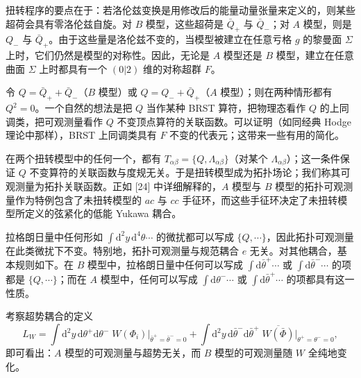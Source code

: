 扭转程序的要点在于：若洛伦兹变换是用修改后的能量动量张量来定义的，则某些超荷会具有零洛伦兹自旋。对 $B$ 模型，这些超荷是 $\bar Q_{+}$ 与 $\bar Q_{-}$；对 $A$ 模型，则是 $Q_{-}$ 与 $\bar Q_{+}$。由于这些量是洛伦兹不变的，当模型被建立在任意亏格 $g$ 的黎曼面 $\Sigma$ 上时，它们仍然是模型的对称性。因此，无论是 $A$ 模型还是 $B$ 模型，建立在任意曲面 $\Sigma$ 上时都具有一个 $(0|2)$ 维的对称超群 $F$。

令 $Q=\bar Q_{+}+\bar Q_{-}$（$B$ 模型）或 $Q=Q_{-}+\bar Q_{+}$（$A$ 模型）；则在两种情形都有 $Q^{2}=0$。一个自然的想法是把 $Q$ 当作某种 BRST 算符，把物理态看作 $Q$ 的上同调类，把可观测量看作 $Q$ 不变顶点算符的关联函数。可以证明（如同经典 Hodge 理论中那样），BRST 上同调类具有 $F$ 不变的代表元；这带来一些有用的简化。


\label{op:34}
在两个扭转模型中的任何一个，都有 $T_{\alpha\beta}=\{Q,\Lambda_{\alpha\beta}\}$（对某个 $\Lambda_{\alpha\beta}$）；这一条件保证 $Q$ 不变算符的关联函数与度规无关。于是扭转模型成为拓扑场论；我们称其可观测量为拓扑关联函数。正如 [24] 中详细解释的，$A$ 模型与 $B$ 模型的拓扑可观测量作为特例包含了未扭转模型的 $ac$ 与 $cc$ 手征环，而这些手征环决定了未扭转模型所定义的弦紧化的低能 Yukawa 耦合。

拉格朗日量中任何形如 $\int \mathrm{d}^{2}y\,\mathrm{d}^{4}\theta\cdots$ 的微扰都可以写成 $\{Q,\cdots\}$，因此拓扑可观测量在此类微扰下不变。特别地，拓扑可观测量与规范耦合 $e$ 无关。对其他耦合，基本规则如下。在 $B$ 模型中，拉格朗日量中任何可以写成 $\int \mathrm{d}\bar\theta^{+}\cdots$ 或 $\int \mathrm{d}\bar\theta^{-}\cdots$ 的项都是 $\{Q,\cdots\}$；而在 $A$ 模型中，任何可以写成 $\int \mathrm{d}\theta^{-}\cdots$ 或 $\int \mathrm{d}\bar\theta^{+}\cdots$ 的项都具有这一性质。

考察超势耦合的定义
\begin{equation}
\tag{3.31}
L_{W}=\int \mathrm{d}^{2}y\,\mathrm{d}\theta^{+}\mathrm{d}\theta^{-}\;W(\Phi_{i})\big|_{\bar\theta^{+}=\bar\theta^{-}=0}+\int \mathrm{d}^{2}y\,\mathrm{d}\bar\theta^{-}\mathrm{d}\bar\theta^{+}\;\overline{W(\bar\Phi)}\big|_{\theta^{+}=\theta^{-}=0},
\end{equation}
即可看出：$A$ 模型的可观测量与超势无关，而 $B$ 模型的可观测量随 $W$ 全纯地变化。

